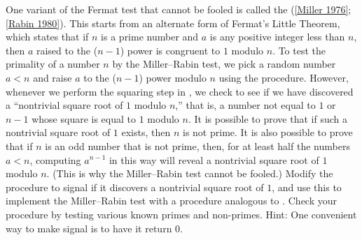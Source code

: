 \begin{exercise}
	\label{Exercise 1.28}
	One variant of the Fermat test that cannot be fooled is called the  (\cref{Miller 1976}; \cref{Rabin 1980}).
	This starts from an alternate form of Fermat’s Little Theorem, which states that if \( n \) is a prime number and \( a \) is any positive integer less than \( n \), then \( a \) raised to the (\( n - 1 \)) power is congruent to \( 1 \) modulo \( n \).
	To test the primality of a number \( n \) by the Miller--Rabin test, we pick a random number \( a < n \) and raise \( a \) to the (\( n - 1 \)) power modulo \( n \) using the  procedure.
	However, whenever we perform the squaring step in , we check to see if we have discovered a “nontrivial square root of \( 1 \) modulo \( n \),” that is, a number not equal to \( 1 \) or \( n - 1 \) whose square is equal to \( 1 \) modulo \( n \).
	It is possible to prove that if such a nontrivial square root of \( 1 \) exists, then \( n \) is not prime.
	It is also possible to prove that if \( n \) is an odd number that is not prime, then, for at least half the numbers \( a < n \), computing \( a^{n - 1} \) in this way will reveal a nontrivial square root of \( 1 \) modulo \( n \).
	(This is why the Miller--Rabin test cannot be fooled.)
	Modify the  procedure to signal if it discovers a nontrivial square root of \( 1 \), and use this to implement the Miller--Rabin test with a procedure analogous to .
	Check your procedure by testing various known primes and non-primes.
	Hint:
	One convenient way to make  signal is to have it return \( 0 \).
\end{exercise}

